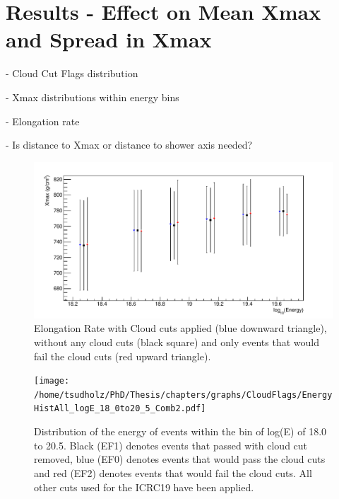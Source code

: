 \section{Results - Effect on Mean Xmax and Spread in Xmax}

- Cloud Cut Flags distribution

- Xmax distributions within energy bins

- Elongation rate  

- Is distance to Xmax or distance to shower axis needed?

\begin{figure}
\centering
\includegraphics[width=\textwidth]{chapters/graphs/CloudFlags/ElongationRate.pdf}
\caption{Elongation Rate with Cloud cuts applied (blue downward triangle), without any cloud cuts (black square) and only events that would fail the cloud cuts (red upward triangle).}
\end{figure}


\begin{figure}
\centering
\texttt{[image: /home/tsudholz/PhD/Thesis/chapters/graphs/CloudFlags/EnergyHistAll\_logE\_18\_0to20\_5\_Comb2.pdf]}
\caption{Distribution of the energy of events within the bin of log(E) of 18.0 to 20.5. Black (EF1) denotes events that passed with cloud cut removed, blue (EF0) denotes events that would pass the cloud cuts and red (EF2) denotes events that would fail the cloud cuts. All other cuts used for the ICRC19 have been applied.}
\end{figure}

